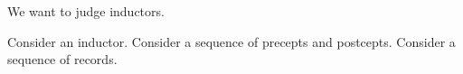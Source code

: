 

We want to judge inductors.


Consider an inductor.
Consider a sequence of precepts
and postcepts.
Consider a sequence of records.
